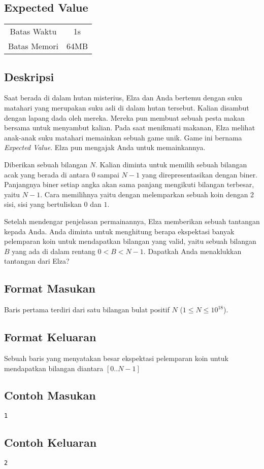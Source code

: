 \documentclass{article}
\begin{document}
\begin{center}
    \section*{Expected Value} %

    \begin{tabular}{ | c c | }
        \hline
        Batas Waktu  & 1s \\    %
        Batas Memori & 64MB \\  %
        \hline
    \end{tabular}
\end{center}

\subsection*{Deskripsi}
Saat berada di dalam hutan misterius, Elza dan Anda bertemu dengan suku matahari yang merupakan suku asli di dalam hutan tersebut.
Kalian disambut dengan lapang dada oleh mereka. Mereka pun membuat sebuah pesta makan bersama untuk menyambut kalian.
Pada saat menikmati makanan, Elza melihat anak-anak suku matahari memainkan sebuah game unik. Game ini bernama \textit{Expected Value}. Elza pun
mengajak Anda untuk memainkannya.

Diberikan sebuah bilangan $N$. Kalian diminta untuk memilih sebuah bilangan acak yang berada di antara $0$ sampai $N-1$ yang 
direpresentasikan dengan biner. Panjangnya biner setiap angka akan sama panjang mengikuti bilangan terbesar, yaitu $N-1$.
Cara memilihnya yaitu dengan melemparkan sebuah koin dengan 2 sisi, sisi yang bertuliskan $0$ dan $1$.

Setelah mendengar penjelasan permainannya, Elza memberikan sebuah tantangan kepada Anda. Anda diminta untuk menghitung berapa 
ekspektasi banyak pelemparan koin untuk mendapatkan bilangan yang valid, yaitu sebuah bilangan $B$ yang ada di dalam rentang $0 < B < N-1$. Dapatkah Anda menaklukkan tantangan dari Elza?

\subsection*{Format Masukan}
Baris pertama terdiri dari satu bilangan bulat positif $N$ ($1 \leq N \leq 10^{18}$).

\subsection*{Format Keluaran}
Sebuah baris yang menyatakan besar ekspektasi pelemparan koin untuk mendapatkan bilangan diantara $[0..N-1]$
\\

\begin{multicols}{2}
\subsection*{Contoh Masukan}
\begin{lstlisting}
1
\end{lstlisting}
\columnbreak
\subsection*{Contoh Keluaran}
\begin{lstlisting}
2
\end{lstlisting}
\vfill
\null
\end{multicols}


\pagebreak
\end{document}
